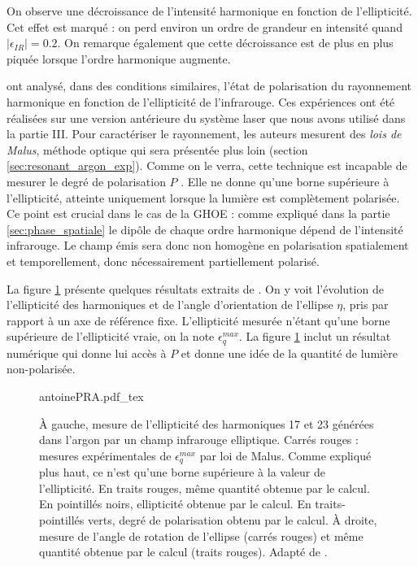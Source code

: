 On observe une décroissance de l'intensité harmonique en fonction de l'ellipticité. Cet effet est marqué : on perd environ un ordre de grandeur en intensité quand $|\epsilon_{IR}| = 0.2$. On remarque également que cette décroissance est de plus en plus piquée lorsque l'ordre harmonique augmente.

 ont analysé, dans des conditions similaires, l'état de polarisation du rayonnement harmonique en fonction de l'ellipticité de l'infrarouge. Ces expériences ont été réalisées sur une version antérieure du système laser que nous avons utilisé dans la partie III. Pour caractériser le rayonnement, les auteurs mesurent des \textit{lois de Malus}, méthode optique qui sera présentée plus loin (section \ref{sec:resonant_argon_exp}). Comme on le verra, cette technique est incapable de mesurer le degré de polarisation $P$ . Elle ne donne qu'une borne supérieure à l'ellipticité, atteinte uniquement lorsque la lumière est complètement polarisée. Ce point est crucial dans le cas de la GHOE : comme expliqué dans la partie \ref{sec:phase_spatiale} le dipôle de chaque ordre harmonique dépend de l'intensité infrarouge. Le champ émis sera donc non homogène en polarisation spatialement et temporellement, donc nécessairement partiellement polarisé.

La figure \ref{fig:antoinepra} présente quelques résultats extraits de . On y voit l'évolution de l'ellipticité des harmoniques et de l'angle d'orientation de l'ellipse $\eta$, pris par rapport à un axe de référence fixe. L'ellipticité mesurée n'étant qu'une borne supérieure de l'ellipticité vraie, on la note $\epsilon^{max}_q$. La figure \ref{fig:antoinepra} inclut un résultat numérique qui donne lui accès à $P$ et donne une idée de la quantité de lumière non-polarisée.

\begin{figure}[!ht]
\centering
\def\svgwidth{\columnwidth}
{antoinePRA.pdf_tex}
\caption{\`{A} gauche, mesure de l'ellipticité des harmoniques 17 et 23 générées dans l'argon par un champ infrarouge elliptique. Carrés rouges : mesures expérimentales de $\epsilon^{max}_q$ par loi de Malus. Comme expliqué plus haut, ce n'est qu'une borne supérieure à la valeur de l'ellipticité. En traits rouges, même quantité obtenue par le calcul. En pointillés noirs, ellipticité obtenue par le calcul. En traits-pointillés verts, degré de polarisation obtenu par le calcul. \`{A} droite, mesure de l'angle de rotation de l'ellipse (carrés rouges) et même quantité obtenue par le calcul (traits rouges). Adapté de .}
\label{fig:antoinepra}
\end{figure}

